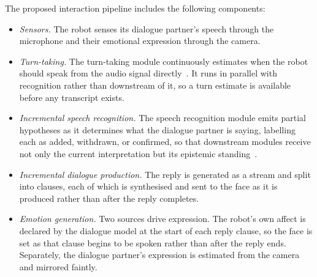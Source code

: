 \documentclass[conference]{IEEEtran}
\begin{document}
The proposed interaction pipeline includes the following components:
\begin{itemize}
  \item \textit{Sensors.} The robot senses its dialogue partner's speech through the microphone and their emotional expression through the camera.

  \item \textit{Turn-taking.} The turn-taking module continuously estimates
        when the robot should speak from the audio signal
        directly~\cite{skantze2021review, ekstedt2022vap}. It runs in parallel
        with recognition rather than downstream of it, so a turn estimate is
        available before any transcript exists.

  \item \textit{Incremental speech recognition.} The speech recognition module emits
        partial hypotheses as it determines what the dialogue partner is saying,
        labelling each as added, withdrawn, or
        confirmed, so that downstream modules receive not only the current
        interpretation but its epistemic standing~\cite{schlangen2011iu,
        michael2020retico}.

  \item \textit{Incremental dialogue production.} The reply is generated as a
        stream and split into clauses, each of which is synthesised and sent to
        the face as it is produced rather than after the reply completes.

  \item \textit{Emotion generation.} Two sources drive expression. The robot's
        own affect is declared by the dialogue model at the start of each
        reply clause, so the face is set as that clause begins to be spoken
        rather than after the reply ends. Separately, the dialogue partner's expression
        is estimated from the camera and mirrored faintly.


\end{itemize}
\end{document}
